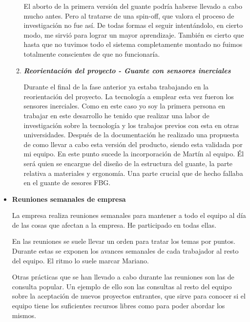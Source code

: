 \begin{itemize}
\begin{enumerate}
				El aborto de la primera versión del guante podría haberse llevado a cabo mucho antes. Pero al tratarse de una spin-off, que valora el proceso de investigación no fue así. De todas formas el seguir intentándolo, en cierto modo, me sirvió para lograr un mayor aprendizaje. También es cierto que hasta que no tuvimos todo el sistema completamente montado no fuimos totalmente conscientes de que no funcionaría. 
				\smallskip
				
				\item \textbf{\textit{Reorientación del proyecto - Guante con sensores inerciales}}
				
				\smallskip	
				Durante el final de la fase anterior ya estaba trabajando en la reorientación del proyecto. La tecnología a emplear esta vez fueron los sensores inerciales. 
				Como en este caso yo soy la primera persona en trabajar en este desarrollo he tenido que realizar una labor de investigación sobre la tecnología y los trabajos previos con esta en otras universidades. 
				Después de la documentación he realizado una propuesta de como llevar a cabo esta versión del producto, siendo esta validada por mi equipo.
				En este punto sucede la incorporación de Martín al equipo. Él será quien se encargue del diseño de la estructura del guante, la parte relativa a materiales y ergonomía. Una parte crucial que de hecho fallaba en el guante de sesores FBG. 
				\smallskip
								
			\end{enumerate}
			
			
			
			\medskip
			
			\item \textbf{Reuniones semanales de empresa} 
			
			\smallskip
			La empresa realiza reuniones semanales para mantener a todo el equipo al día de las cosas que afectan a la empresa. He participado en todas ellas. 
			
			En las reuniones se suele llevar un orden para tratar los temas por puntos. Durante estas se exponen los avances semanales de cada trabajador al resto del equipo. El ritmo lo suele marcar Mariano. 
			
			Otras prácticas que se han llevado a cabo durante las reuniones son las de consulta popular. Un ejemplo de ello son las consultas al resto del equipo sobre la aceptación de nuevos proyectos entrantes, que sirve para conocer si el equipo tiene los suficientes recursos libres como para poder abordar los mismos. 
			

\end{itemize}
